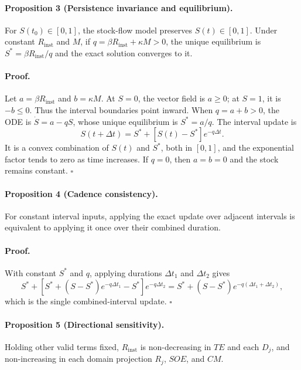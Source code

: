 \documentclass[11pt]{article}
\begin{document}
\paragraph{Proposition 3 (Persistence invariance and equilibrium).}
For $S(t_0)\in[0,1]$, the stock-flow model preserves $S(t)\in[0,1]$. Under constant
$R_{\mathrm{inst}}$ and $M$, if $q=\beta R_{\mathrm{inst}}+\kappa M>0$, the unique
equilibrium is $S^*=\beta R_{\mathrm{inst}}/q$ and the exact solution converges to it.

\paragraph{Proof.}
Let $a=\beta R_{\mathrm{inst}}$ and $b=\kappa M$. At $S=0$, the vector field is
$a\geq0$; at $S=1$, it is $-b\leq0$. Thus the interval boundaries point inward.
When $q=a+b>0$, the ODE is $\dot S=a-qS$, whose unique equilibrium is $S^*=a/q$.
The interval update is
\begin{equation}
  S(t+\Delta t)=S^*+[S(t)-S^*]e^{-q\Delta t}.
\end{equation}
It is a convex combination of $S(t)$ and $S^*$, both in $[0,1]$, and the exponential
factor tends to zero as time increases. If $q=0$, then $a=b=0$ and the stock remains
constant. $\square$

\paragraph{Proposition 4 (Cadence consistency).}
For constant interval inputs, applying the exact update over adjacent intervals is
equivalent to applying it once over their combined duration.

\paragraph{Proof.}
With constant $S^*$ and $q$, applying durations $\Delta t_1$ and $\Delta t_2$ gives
\begin{equation}
  S^*+\left[S^*+(S-S^*)e^{-q\Delta t_1}-S^*\right]e^{-q\Delta t_2}
  =S^*+(S-S^*)e^{-q(\Delta t_1+\Delta t_2)},
\end{equation}
which is the single combined-interval update. $\square$

\paragraph{Proposition 5 (Directional sensitivity).}
Holding other valid terms fixed, $R_{\mathrm{inst}}$ is non-decreasing in $TE$ and
each $D_j$, and non-increasing in each domain projection $R_j$, $SOE$, and $CM$.
\end{document}
